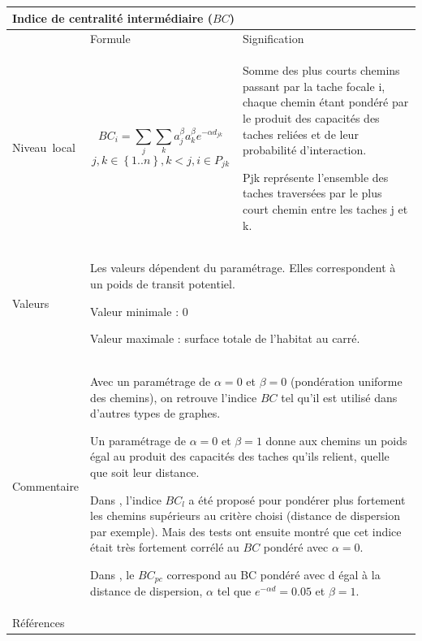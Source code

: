 \documentclass{article}
\begin{document}
\begin{table}[H]
\begin{tabular}{|m{3.24cm}|m{4.4810004cm}m{7.924cm}|}
\hline
\multicolumn{3}{|m{16.044998cm}|}{Indice de centralité intermédiaire ($BC$)}\\\hline
 &
\multicolumn{1}{m{4.4810004cm}|}{Formule} &
Signification\\\hline
Niveau~local &
\multicolumn{1}{m{4.4810004cm}|}{\begin{equation*}
{\mathit{BC}}_{i}=\sum _{j}{\sum _{k}{{a}_{j}^{\beta }}}{a}_{k}^{\beta }{e}^{-\alpha {d}_{\mathit{jk}}}
\end{equation*}
\begin{equation*}
j,k{\in}\left\{1..n\right\},k<j,i{\in}{P}_{\mathit{jk}}
\end{equation*}
} &
Somme des plus courts chemins passant par la tache focale i, chaque chemin étant pondéré par le produit des capacités des taches reliées et de leur probabilité d’interaction.

Pjk représente l’ensemble des taches traversées par le plus court chemin entre les taches j et k.

\\\hline
Valeurs &
\multicolumn{2}{m{12.6050005cm}|}{Les valeurs dépendent du paramétrage. Elles correspondent à un poids de transit potentiel.

Valeur minimale : 0

Valeur maximale : surface totale de l’habitat au carré.

}\\\hline
Commentaire &
\multicolumn{2}{m{12.6050005cm}|}{Avec un paramétrage de $\alpha=0$ et $\beta =0$ (pondération uniforme des chemins), on retrouve l’indice $BC$ tel qu’il est utilisé dans d’autres types de graphes.

Un paramétrage de $\alpha=0$ et $\beta=1$ donne aux chemins un poids égal au produit des capacités des taches qu’ils relient, quelle que soit leur distance.

Dans \cite{2012_graphab_EMS, 2012_SDM}, l’indice $BC_l$ a été proposé pour pondérer plus fortement les chemins supérieurs au critère choisi (distance de dispersion par exemple). Mais des tests ont ensuite montré que cet indice était très fortement corrélé au $BC$ pondéré avec $\alpha=0$.

Dans \cite{Bodin2010}, le  ${\mathit{BC}}_{\mathit{pc}}$ correspond au BC pondéré avec d égal à la distance de dispersion,   $\alpha $ tel que  ${e}^{-\mathit{\alpha d}}=0.05$ et  $\beta=1$.

}\\\hline
Références &
\multicolumn{2}{m{12.6050005cm}|}{
\cite{Bodin2010}
\cite{2012_graphab_EMS}

}\\\hline
\end{tabular}
\end{table}
\end{document}
